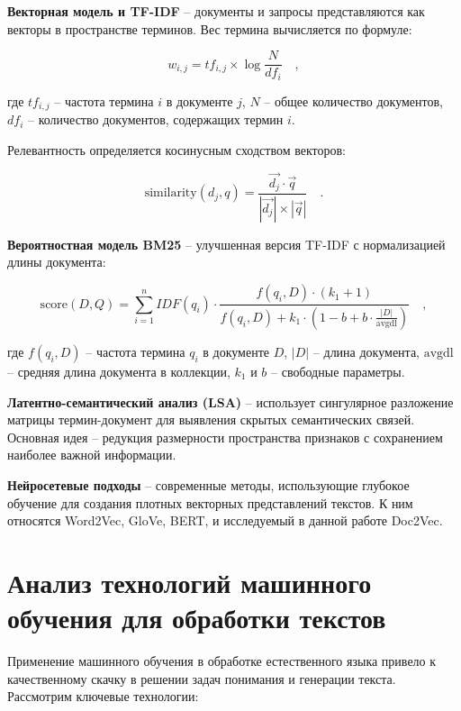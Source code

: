 	\textbf{Векторная модель и TF-IDF} – документы и запросы представляются как векторы в пространстве терминов. Вес термина вычисляется по формуле:
	
	\begin{equation}
		w_{i,j} = tf_{i,j} \times \log\frac{N}{df_i} \quad,
	\end{equation}
	
	\noindent где $tf_{i,j}$ – частота термина $i$ в документе $j$, $N$ – общее количество документов, $df_i$ – количество документов, содержащих термин $i$.
	
	Релевантность определяется косинусным сходством векторов:
	
	\begin{equation}
		\text{similarity}(d_j, q) = \frac{\vec{d_j} \cdot \vec{q}}{|\vec{d_j}| \times |\vec{q}|} \quad.
	\end{equation}
	
	\textbf{Вероятностная модель BM25} – улучшенная версия TF-IDF с нормализацией длины документа:
	
	\begin{equation}
		\text{score}(D,Q) = \sum_{i=1}^{n} IDF(q_i) \cdot \frac{f(q_i, D) \cdot (k_1 + 1)}{f(q_i, D) + k_1 \cdot (1 - b + b \cdot \frac{|D|}{\text{avgdl}})}  \quad,
	\end{equation}
	
	\noindent где $f(q_i, D)$ – частота термина $q_i$ в документе $D$, $|D|$ – длина документа, $\text{avgdl}$ – средняя длина документа в коллекции, $k_1$ и $b$ – свободные параметры.
	
	\textbf{Латентно-семантический анализ (LSA)} – использует сингулярное разложение матрицы термин-документ для выявления скрытых семантических связей. Основная идея – редукция размерности пространства признаков с сохранением наиболее важной информации.
	
	\textbf{Нейросетевые подходы} – современные методы, использующие глубокое обучение для создания плотных векторных представлений текстов. К ним относятся Word2Vec, GloVe, BERT, и исследуемый в данной работе Doc2Vec.
	
	\section{Анализ технологий машинного обучения для обработки текстов}
	
	Применение машинного обучения в обработке естественного языка привело к качественному скачку в решении задач понимания и генерации текста. Рассмотрим ключевые технологии:
	
